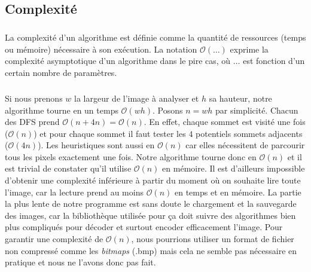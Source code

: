 \subsection{Complexité}
\subparagraph{}
La complexité d'un algorithme est définie comme la quantité de ressources (temps ou mémoire) nécessaire à son exécution. La notation $\mathcal O(\ldots)$ exprime la complexité asymptotique d'un algorithme dans le pire cas, où $\ldots$ est fonction d'un certain nombre de paramètres.

\subparagraph{}
Si nous prenons $w$ la largeur de l'image à analyser et $h$ sa hauteur, notre algorithme tourne en un temps $\mathcal O(wh)$. Posons $n = wh$ par simplicité. Chacun des DFS prend $\mathcal O(n + 4n) = \mathcal O(n)$. En effet, chaque sommet est visité une fois ($\mathcal O(n)$) et pour chaque sommet il faut tester les $4$ potentiels sommets adjacents ($\mathcal O(4n)$). Les heuristiques sont aussi en $\mathcal O(n)$ car elles nécessitent de parcourir tous les pixels exactement une fois. Notre algorithme tourne donc en $\mathcal O(n)$ et il est trivial de constater qu'il utilise $\mathcal O(n)$ en mémoire. Il est d'ailleurs impossible d'obtenir une complexité inférieure à partir du moment où on souhaite lire toute l'image, car la lecture prend au moins $\mathcal O(n)$ en temps et en mémoire. La partie la plus lente de notre programme est sans doute le chargement et la sauvegarde des images, car la bibliothèque utilisée pour ça doit suivre des algorithmes bien plus compliqués pour décoder et surtout encoder efficacement l'image. Pour garantir une complexité de $\mathcal O(n)$, nous pourrions utiliser un format de fichier non compressé comme les \textit{bitmaps} (.bmp) mais cela ne semble pas nécessaire en pratique et nous ne l'avons donc pas fait.